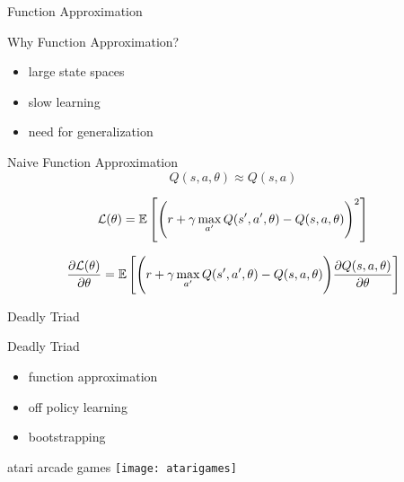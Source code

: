 \begin{frame}{Function Approximation}

    Why Function Approximation?

    \begin{itemize}
        \item large state spaces
        \item slow learning
        \item need for generalization
    \end{itemize}

\end{frame}

\begin{frame}{Naive Function Approximation}
    \begin{equation*}
    Q(s,a,\theta ) \approx Q(s,a)
\end{equation*}

\begin{equation*}
    \mathcal{L}(\theta )=\operatorname{\mathbb{E}} \left [\Bigg( r+\gamma\max_{a'} Q(s',a',\theta )-Q(s,a,\theta )\Bigg)^2\right] 
\end{equation*}

\begin{equation*}
    \frac{\partial \mathcal{L}(\theta )}{\partial \theta }=\operatorname{\mathbb{E}} \left [\Bigg( r+\gamma\max_{a'} Q(s',a',\theta )-Q(s,a,\theta )\Bigg)\frac{\partial Q(s,a,\theta )}{\partial \theta }\right] 
\end{equation*}


\end{frame}

\begin{frame}{Deadly Triad}

    \begin{alertblock}{Deadly Triad}
        \begin{itemize}
        \item function approximation
        \item off policy learning
        \item bootstrapping
        \end{itemize}
	\end{alertblock}
      

\end{frame}



\begin{frame}{atari arcade games}
\texttt{[image: atarigames]}
\end{frame}


